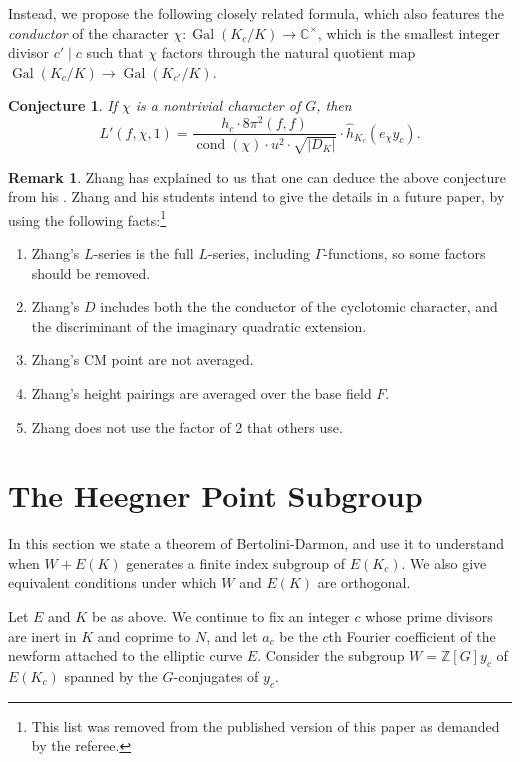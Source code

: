 \documentclass[preprint,12pt]{elsarticle}
\newcommand{\C}{\mathbb{C}}
\newcommand{\hhat}{\hat{h}}
\newcommand{\Z}{\mathbb{Z}}
\DeclareMathOperator{\Gal}{Gal}
\DeclareMathOperator{\cond}{cond}
\theoremstyle{plain}
\newtheorem{conjecture}[theorem]{Conjecture}
\theoremstyle{definition}
\newtheorem{remark}[theorem]{Remark}
\begin{document}
Instead, we propose the following closely related formula, which also
features the {\em conductor} of the character $\chi:\Gal(K_c/K)\to
\C^\times$, which is the smallest integer divisor $c'\mid c$ such that
$\chi$ factors through the natural quotient map $\Gal(K_c/K) \to
\Gal(K_{c'}/K)$.
\begin{conjecture}
\label{conj:gz}
If $\chi$ is a nontrivial
character of $G$, then
$$
L'(f, \chi, 1) = \frac{h_c\cdot 8 \pi^2 (f,f)}{\cond(\chi) \cdot u^2 \cdot\sqrt{|D_K|}} \cdot \hhat_{K_c}(e_\chi y_c).
$$
\end{conjecture}

\begin{remark} 
  Zhang has explained to us that one can deduce the above conjecture
  from his \cite[Thm~6.1]{zhang:gzgl2}. 
Zhang and his students intend to give the details in a
future paper, by using the following facts:\footnote{This list was removed from the published version of this paper as demanded by the referee.}
\begin{enumerate}\setlength{\itemsep}{.1ex}
\item Zhang's $L$-series is the full $L$-series, including $\Gamma$-functions, so
some factors should be removed.
\item Zhang's $D$ includes both the the conductor of the cyclotomic character,
and the discriminant of the imaginary quadratic extension.
\item Zhang's CM point are not averaged.
\item Zhang's height pairings are averaged over the base field $F$.
\item Zhang does not use the factor of 2 that others use.
\end{enumerate}
\end{remark}


\section{The Heegner Point Subgroup}\label{sec:W}
In this section we state a theorem of Bertolini-Darmon, and use it to
understand when $W+E(K)$ generates a finite index subgroup of
$E(K_c)$.  We also give equivalent conditions under which $W$ and
$E(K)$ are orthogonal.

Let $E$ and $K$ be as above.  We continue to fix an integer $c$ whose
prime divisors are inert in $K$ and coprime to $N$, and let $a_c$ be
the $c$th Fourier coefficient of the newform attached to the elliptic
curve $E$.  Consider the subgroup $W = \Z[G] y_c$ of $E(K_c)$ spanned
by the $G$-conjugates of $y_c$.  
\end{document}
